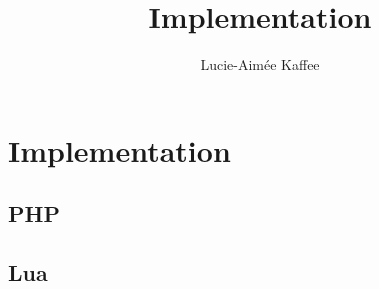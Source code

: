 \documentclass[11pt]{article}
\title {{Implementation}}
\author {Lucie-Aim\'{e}e Kaffee}
\date{}
\begin{document}
	\section{Implementation}

	\subsection{PHP}
	

	\subsection{Lua}
	
\end{document}

